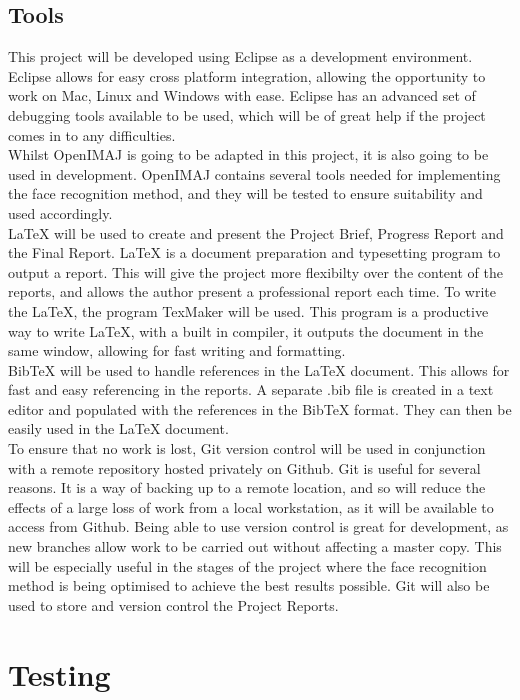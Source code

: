\documentclass[12pt, a4paper]{article}
\begin{document}
\subsection{Tools} 
This project will be developed using Eclipse as a development environment. Eclipse allows for easy cross platform integration, allowing the opportunity to work on Mac, Linux and Windows with ease. Eclipse has an advanced set of debugging tools available to be used, which will be of great help if the project comes in to any difficulties.\\ 
Whilst OpenIMAJ is going to be adapted in this project, it is also going to be used in development. OpenIMAJ contains several tools needed for implementing the face recognition method, and they will be tested to ensure suitability and used accordingly. \\
\LaTeX{} will be used to create and present the Project Brief, Progress Report and the Final Report. \LaTeX{} is a document preparation and typesetting program to output a report. This will give the project more flexibilty over the content of the reports, and allows the author present a professional report each time. To write the \LaTeX{}, the program TexMaker will be used. This program is a productive way to write \LaTeX{}, with a built in compiler, it outputs the document in the same window, allowing for fast writing and formatting.\\
BibTeX will be used to handle references in the \LaTeX{} document. This allows for fast and easy referencing in the reports. A separate .bib file is created in a text editor and populated with the references in the BibTeX format. They can then be easily used in the \LaTeX{} document.\\
To ensure that no work is lost, Git version control will be used in conjunction with a remote repository hosted privately on Github. Git is useful for several reasons. It is a way of backing up to a remote location, and so will reduce the effects of a large loss of work from a local workstation, as it will be available to access from Github. Being able to use version control is great for development, as new branches allow work to be carried out without affecting a master copy. This will be especially useful in the stages of the project where the face recognition method is being optimised to achieve the best results possible. Git will also be used to store and version control the Project Reports.

\section{Testing}
\end{document}
